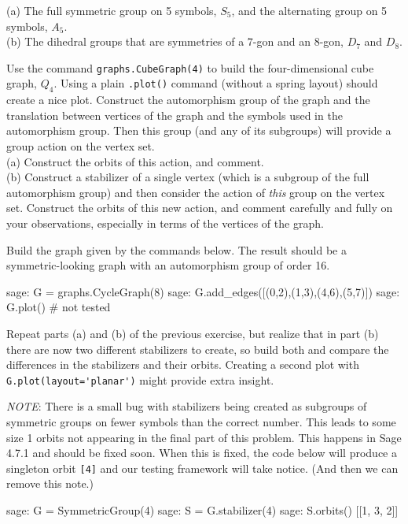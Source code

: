 (a) The full symmetric group on 5 symbols, $S_5$, and the alternating group on 5 symbols, $A_5$.\\
(b) The dihedral groups that are symmetries of a $7$-gon and an $8$-gon, $D_{7}$ and $D_{8}$.
\begin{sageverbatim}\end{sageverbatim}
%
%
Use the command \verb?graphs.CubeGraph(4)? to build the four-dimensional cube graph, $Q_4$.  Using a plain \verb?.plot()? command (without a spring layout) should create a nice plot.  Construct the automorphism group of the graph and the translation between vertices of the graph and the symbols used in the automorphism group.  Then this group (and any of its subgroups) will provide a group action on the vertex set.\\
%
(a) Construct the orbits of this action, and comment.\\
(b) Construct a stabilizer of a single vertex (which is a subgroup of the full automorphism group) and then consider the action of \emph{this} group on the vertex set.  Construct the orbits of this new action, and comment carefully and fully on your observations, especially in terms of the vertices of the graph.
\begin{sageverbatim}\end{sageverbatim}
%
%
Build the graph given by the commands below.  The result should be a symmetric-looking graph with an automorphism group of order 16.
%
%
\begin{sageexample}
sage: G = graphs.CycleGraph(8)
sage: G.add_edges([(0,2),(1,3),(4,6),(5,7)])
sage: G.plot()                  # not tested
\end{sageexample}
%
Repeat parts (a) and (b) of the previous exercise, but realize that in part (b) there are now two different stabilizers to create, so build both and compare the differences in the stabilizers and their orbits.  Creating a second plot with \verb?G.plot(layout='planar')? might provide extra insight.\par
%
\emph{NOTE}: There is a small bug with stabilizers being created as subgroups of symmetric groups on fewer symbols than the correct number.  This leads to some size 1 orbits not appearing in the final part of this problem.  This happens in Sage 4.7.1 and should be fixed soon.  When this is fixed, the code below will produce a singleton orbit \texttt{[4]} and our testing framework will take notice.  (And then we can remove this note.)
%
\begin{sageexample}
sage: G = SymmetricGroup(4)
sage: S = G.stabilizer(4)
sage: S.orbits()
[[1, 3, 2]]
\end{sageexample}
%

